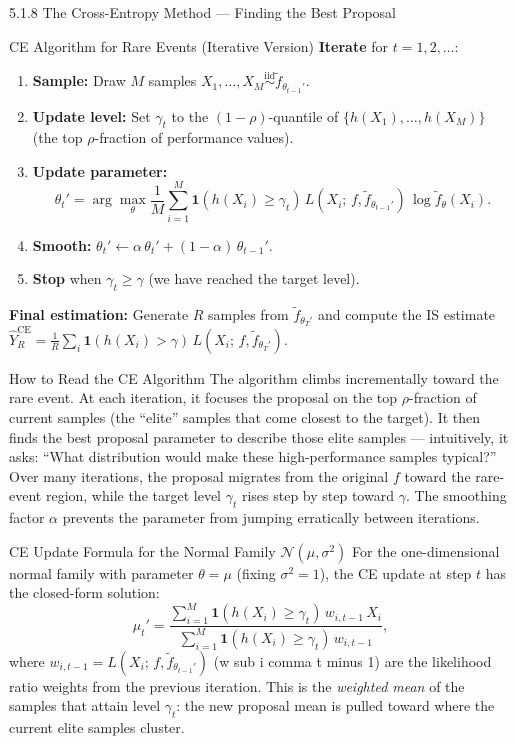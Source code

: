 \documentclass[aspectratio=169,10pt]{beamer}
\begin{document}
\begin{frame}[allowframebreaks]{5.1.8 The Cross-Entropy Method --- Finding the Best Proposal}
\begin{block}{CE Algorithm for Rare Events (Iterative Version)}
  \textbf{Iterate} for $t = 1, 2, \ldots$:
  \begin{enumerate}
    \item \textbf{Sample:}
          Draw $M$ samples $X_1, \ldots, X_M \overset{\mathrm{iid}}{\sim} \tilde{f}_{\theta_{t-1}'}$.
    \item \textbf{Update level:}
          Set $\gamma_t$ to the $(1-\rho)$-quantile of $\{h(X_1), \ldots, h(X_M)\}$
          (the top $\rho$-fraction of performance values).
    \item \textbf{Update parameter:}
          \[
            \theta_t'
            = \arg\max_\theta \frac{1}{M}\sum_{i=1}^M
            \mathbf{1}(h(X_i)\ge\gamma_t)\,L(X_i;\,f, \tilde{f}_{\theta_{t-1}'})\,
            \log\tilde{f}_\theta(X_i).
          \]
    \item \textbf{Smooth:}
          $\theta_t' \leftarrow \alpha\,\theta_t' + (1-\alpha)\,\theta_{t-1}'$.
    \item \textbf{Stop} when $\gamma_t \ge \gamma$ (we have reached the target level).
  \end{enumerate}

  \textbf{Final estimation:} Generate $R$ samples from $\tilde{f}_{\theta_T'}$
  and compute the IS estimate
  $\hat{Y}_R^{\mathrm{CE}} = \frac{1}{R}\sum_i \mathbf{1}(h(X_i)>\gamma)\,L(X_i;\,f, \tilde{f}_{\theta_T'})$.
\end{block}

\framebreak

\begin{alertblock}{How to Read the CE Algorithm}
  The algorithm climbs incrementally toward the rare event.
  At each iteration, it focuses the proposal on the top $\rho$-fraction of
  current samples (the ``elite'' samples that come closest to the target).
  It then finds the best proposal parameter to describe those elite samples ---
  intuitively, it asks: ``What distribution would make these high-performance
  samples typical?''  Over many iterations, the proposal migrates from the
  original $f$ toward the rare-event region, while the target level $\gamma_t$
  rises step by step toward $\gamma$.
  The smoothing factor $\alpha$ prevents the parameter from jumping erratically
  between iterations.
\end{alertblock}

\begin{block}{CE Update Formula for the Normal Family $\mathcal{N}(\mu, \sigma^2)$}
  For the one-dimensional normal family with parameter $\theta = \mu$ (fixing $\sigma^2 = 1$),
  the CE update at step $t$ has the closed-form solution:
  \[
    \mu_t'
    = \frac{\displaystyle\sum_{i=1}^M \mathbf{1}(h(X_i)\ge\gamma_t)\,w_{i,t-1}\,X_i}
           {\displaystyle\sum_{i=1}^M \mathbf{1}(h(X_i)\ge\gamma_t)\,w_{i,t-1}},
  \]
  where $w_{i,t-1} = L(X_i;\,f, \tilde{f}_{\theta_{t-1}'})$ (w sub i comma t minus 1)
  are the likelihood ratio weights from the previous iteration.
  This is the \emph{weighted mean} of the samples that attain level $\gamma_t$:
  the new proposal mean is pulled toward where the current elite samples cluster.


\end{block}
\end{frame}
\end{document}

